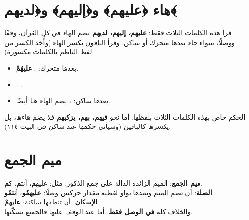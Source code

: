 \section{هاء ﴿عليهم﴾ و﴿إليهم﴾ و﴿لديهم﴾}

\begin{mufradat}
\end{mufradat}

\maana
قرأ \Hamza{} هذه الكلمات الثلاث فقط: \textbf{عليهم، إليهم، لديهم} بضم الهاء في كل القرآن، وقفًا ووصلًا، سواء جاء بعدها متحرك أو ساكن.
وقرأ الباقون بكسر الهاء (وأُخذ الكسر من لفظ الناظم بالكلمات مكسورة).

\begin{qiraat}
\end{qiraat}

\begin{amthila}
\begin{itemize}
\item بعدها متحرك:   \ila{} \Hamza: \textbf{عليهُمْ}.
\item {} ،  .
\item بعدها ساكن:  ،   \ila{} \Hamza{} يضم الهاء هنا أيضًا.
\end{itemize}
\end{amthila}

\begin{tanbih}
الحكم خاص بهذه الكلمات الثلاث بلفظها. أما نحو \textbf{فيهم، بهم، يزكيهم} فلا يضم \Hamza{} هاءها، بل يكسرها كالباقين (وسيأتي حكمها عند ساكن في البيت ١١٤).
\end{tanbih}

\section{ميم الجمع}
\begin{qaida}
\textbf{ميم الجمع}: الميم الزائدة الدالة على جمع الذكور، مثل: عليه\textbf{م}، أنت\textbf{م}، ك\textbf{م}.\\
\textbf{الصلة}: أن تضم الميم وتمدها بواو لفظية مقدار حركتين وصلًا: \textbf{عليهمُو}، \textbf{أنتمُو}.\\
\textbf{الإسكان}: أن تنطقها ساكنة: \textbf{عليهمْ}.\\
والخلاف كله \textbf{في الوصل فقط}. أما عند الوقف عليها فالجميع يسكّنها.
\end{qaida}

